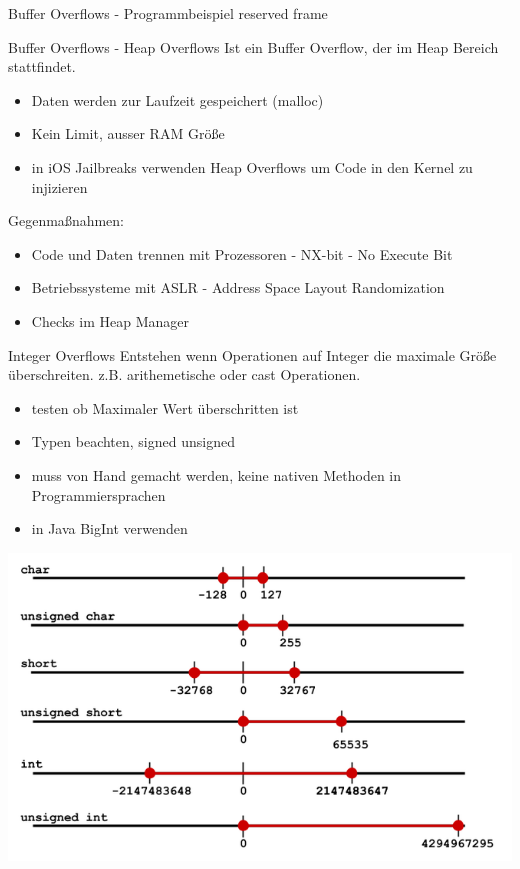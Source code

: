 \documentclass[10pt]{beamer}
\begin{document}
\begin{frame}[fragile]{Buffer Overflows - Programmbeispiel}
  reserved frame
\end{frame}

\begin{frame}[fragile]{Buffer Overflows - Heap Overflows}
  Ist ein Buffer Overflow, der im Heap Bereich stattfindet.
  \begin{itemize}
    \item Daten werden zur Laufzeit gespeichert (malloc)
    \item Kein Limit, ausser RAM Gr\"o{\ss}e
    \item in iOS Jailbreaks verwenden Heap Overflows um Code in den Kernel zu injizieren
  \end{itemize}
  Gegenma{\ss}nahmen:
  \begin{itemize}
    \item Code und Daten trennen mit Prozessoren - NX-bit - No Execute Bit
    \item Betriebssysteme mit ASLR - Address Space Layout Randomization
    \item Checks im Heap Manager
  \end{itemize}
\end{frame}

\begin{frame}[fragile]{Integer Overflows}
  Entstehen wenn Operationen auf Integer die maximale Gr\"o{\ss}e \"uberschreiten. z.B. arithemetische oder cast Operationen.
  \begin{itemize}
    \item testen ob Maximaler Wert \"uberschritten ist
    \item Typen beachten, signed unsigned
    \item muss von Hand gemacht werden, keine nativen Methoden in Programmiersprachen
    \item in Java BigInt verwenden
  \end{itemize}
  \includegraphics[scale=0.25]{integer_overflow}
\end{frame}
\end{document}
